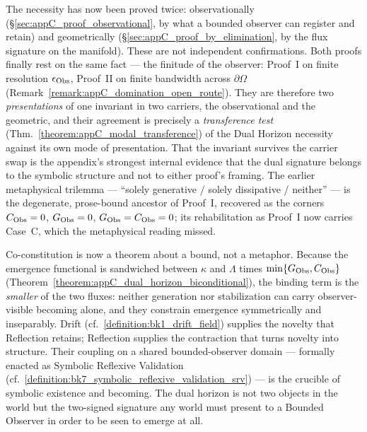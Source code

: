 \begin{scholium}
\label{scholium:appC_two_modalities_one_root}
The necessity has now been proved twice: observationally
(\S\ref{sec:appC_proof_observational}, by what a bounded observer can register and
retain) and geometrically (\S\ref{sec:appC_proof_by_elimination}, by the flux
signature on the manifold). These are not independent confirmations. Both proofs
finally rest on the same fact --- the finitude of the observer: Proof~I on finite
resolution \(\epsilon_{\mathrm{Obs}}\), Proof~II on finite bandwidth across \(\partial\Omega\)
(Remark~\ref{remark:appC_domination_open_route}). They are therefore two
\emph{presentations} of one invariant in two carriers, the observational and the
geometric, and their agreement is precisely a \emph{transference test}
(Thm.~\ref{theorem:appC_modal_transference}) of the Dual Horizon necessity against its
own mode of presentation. That the invariant survives the carrier swap is the
appendix's strongest internal evidence that the dual signature belongs to the symbolic
structure and not to either proof's framing. The earlier metaphysical trilemma ---
``solely generative / solely dissipative / neither'' --- is the degenerate, prose-bound
ancestor of Proof~I, recovered as the corners \(C_{\mathrm{Obs}}=0\), \(G_{\mathrm{Obs}}=0\),
\(G_{\mathrm{Obs}}=C_{\mathrm{Obs}}=0\); its rehabilitation as Proof~I now carries Case~C, which the
metaphysical reading missed.
\end{scholium}

\begin{scholium}
\label{scholium:appC_two_horizons_co_constitutive}
Co-constitution is now a theorem about a bound, not a metaphor. Because the emergence
functional is sandwiched between \(\kappa\) and \(\Lambda\) times
\(\min\{G_{\mathrm{Obs}},C_{\mathrm{Obs}}\}\) (Theorem~\ref{theorem:appC_dual_horizon_biconditional}),
the binding term is the \emph{smaller} of the two fluxes: neither generation nor
stabilization can carry observer-visible becoming alone, and they constrain emergence
symmetrically and inseparably. Drift (cf.~\ref{definition:bk1_drift_field}) supplies
the novelty that Reflection retains; Reflection supplies the contraction that turns
novelty into structure. Their coupling on a shared bounded-observer domain --- formally
enacted as Symbolic Reflexive Validation
(cf.~\ref{definition:bk7_symbolic_reflexive_validation_srv}) --- is the crucible of
symbolic existence and becoming. The dual horizon is not two objects in the world but the two-signed
signature any world must present to a Bounded Observer in order to be seen to emerge at
all.
\end{scholium}
\clearpage

